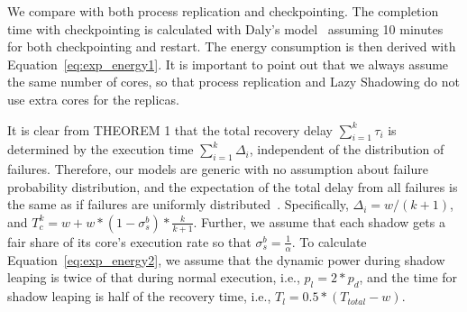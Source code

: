 We compare with both process replication and checkpointing. %
The completion time with checkpointing is calculated with Daly's model~\cite{daly_fgcs_2006} assuming 10 minutes for both checkpointing and restart. The energy consumption is then derived with Equation~\ref{eq:exp_energy1}. It is important to point out that we always assume the same number of cores, so that process replication and Lazy Shadowing do not use extra cores for the replicas. 

It is clear from THEOREM 1 that the total recovery delay $\sum_{i=1}^k\tau_i$ is determined by the execution time $\sum_{i=1}^k\Delta_i$, independent of the distribution of failures. 
Therefore, our models are generic with no assumption about failure probability distribution, and the expectation of the total delay from all failures is the same as if failures are uniformly distributed~\cite{daly_fgcs_2006}. Specifically, $\Delta_i = w/(k+1)$, and $T_c^k = w + w*(1-\sigma_s^b)*\frac{k}{k+1}$. Further, we assume that each shadow gets a fair share of its core's execution rate so that $\sigma_s^b = \frac{1}{\alpha}$. %
To calculate Equation~\ref{eq:exp_energy2}, we assume that the dynamic power during shadow leaping is twice of that during normal execution, i.e., $p_{l}=2*p_d$, and the time for shadow leaping is half of the recovery time, i.e., $T_l=0.5*(T_{total} - w)$. %


